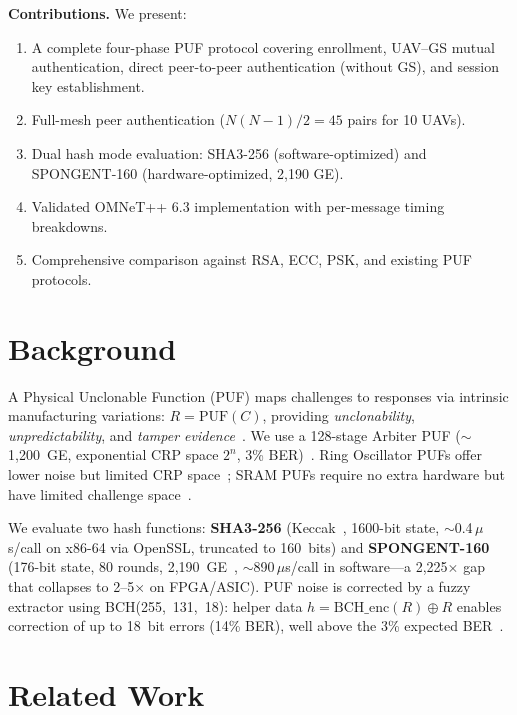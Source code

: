 \documentclass[conference]{IEEEtran}
\begin{document}
\textbf{Contributions.} We present:
\begin{enumerate}[leftmargin=*,nosep]
    \item A complete four-phase PUF protocol covering enrollment, UAV--GS mutual authentication, direct peer-to-peer authentication (without GS), and session key establishment.
    \item Full-mesh peer authentication ($N(N{-}1)/2 = 45$ pairs for 10 UAVs).
    \item Dual hash mode evaluation: SHA3-256 (software-optimized) and SPONGENT-160 (hardware-optimized, 2,190 GE).
    \item Validated OMNeT++ 6.3 implementation with per-message timing breakdowns.
    \item Comprehensive comparison against RSA, ECC, PSK, and existing PUF protocols.
\end{enumerate}

\section{Background}
\label{sec:background}

A Physical Unclonable Function (PUF) maps challenges to responses via intrinsic manufacturing variations: $R = \text{PUF}(C)$, providing \emph{unclonability}, \emph{unpredictability}, and \emph{tamper evidence}~\cite{puf_overview}. We use a 128-stage Arbiter PUF ($\sim$1,200~GE, exponential CRP space $2^n$, 3\% BER)~\cite{arbiter_puf_iot}. Ring Oscillator PUFs offer lower noise but limited CRP space~\cite{ro_puf_design}; SRAM PUFs require no extra hardware but have limited challenge space~\cite{sram_puf_bch}.

We evaluate two hash functions: \textbf{SHA3-256} (Keccak~\cite{sha3_standard}, 1600-bit state, $\sim$0.4\,$\mu$s/call on x86-64 via OpenSSL, truncated to 160~bits) and \textbf{SPONGENT-160} (176-bit state, 80 rounds, 2,190~GE~\cite{spongent_original}, $\sim$890\,$\mu$s/call in software---a 2,225$\times$ gap that collapses to 2--5$\times$ on FPGA/ASIC). PUF noise is corrected by a fuzzy extractor using BCH(255,~131,~18): helper data $h = \text{BCH\_enc}(R) \oplus R$ enables correction of up to 18~bit errors (14\% BER), well above the 3\% expected BER~\cite{bch_puf_extraction}.

\section{Related Work}
\label{sec:related}
\end{document}
